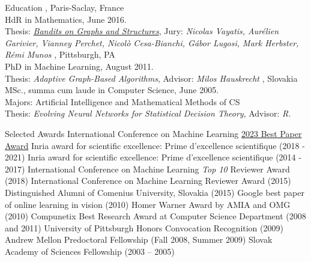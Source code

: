 \documentclass{resume}
\begin{document}
\begin{category}{Education}
, Paris-Saclay, France \\ %
HdR in Mathematics, June 2016.\\
Thesis: \href{http://researchers.lille.inria.fr/~valko/hp/publications/valko2016bandits.pdf}{\emph{Bandits on Graphs and Structures}}, Jury:\/ \emph{Nicolas Vayatis, Aur\' elien Garivier, Vianney Perchet, Nicol\`o Cesa-Bianchi, G\' abor Lugosi,  Mark Herbster, R\' emi Munos}
, Pittsburgh, PA \\ %
PhD in Machine Learning, August 2011.\\
Thesis: \emph{Adaptive Graph-Based Algorithms}, Advisor: \emph{Milos Hauskrecht}
, Slovakia\\%
MSc., summa cum laude in Computer Science, June 2005.\\
Majors: Artificial Intelligence  and Mathematical Methods of CS\\ %
Thesis: \emph{Evolving Neural Networks for Statistical Decision Theory}, Advisor:  \emph{R.\@Harman}
\end{category}
\begin{category}{Selected Awards}
\citemnobullet  International Conference on Machine Learning 
\href{https://arxiv.org/pdf/2212.12567}{2023 Best Paper Award}
	\citemnobullet Inria award for scientific excellence:
Prime d'excellence scientifique (2018 - 2021)
	\citemnobullet Inria award for scientific excellence:
Prime d'excellence scientifique (2014 - 2017)
\citemnobullet International Conference on Machine Learning \emph{Top 10} Reviewer Award (2018)
\citemnobullet International Conference on Machine Learning Reviewer Award (2015)
\citemnobullet Distinguished Alumni of Comenius University, Slovakia (2015)
\citemnobullet  Google best paper of online learning in vision (2010)
\citemnobullet Homer Warner Award by AMIA and OMG (2010)
	\citemnobullet Compunetix Best Research Award at Computer Science 
Department (2008 and 2011)	
	\citemnobullet University of Pittsburgh Honors Convocation Recognition (2009)
       \citemnobullet Andrew Mellon Predoctoral Fellowship (Fall 2008, Summer 
2009)	
       \citemnobullet Slovak Academy of Sciences Fellowship (2003 -- 2005)

\end{category}
\end{document}
